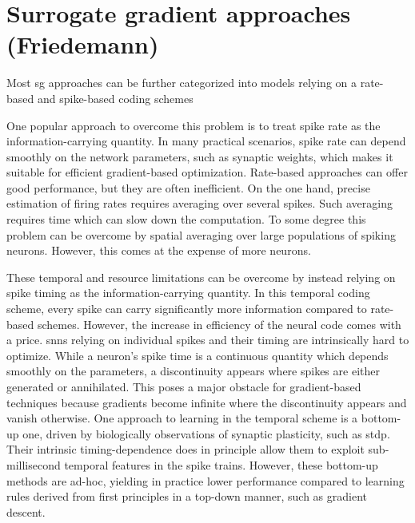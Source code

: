 \documentclass[journal,onecolumn,11pt]{IEEEtran}
\begin{document}
\section{Surrogate gradient approaches (Friedemann)}


Most \gls{sg} approaches can be further categorized into models relying on a rate-based and spike-based coding schemes

One popular approach to overcome this problem is to treat spike rate as the information-carrying quantity.
In many practical scenarios, spike rate can depend smoothly on the network parameters, such as synaptic weights, which makes it suitable for efficient gradient-based optimization.
Rate-based approaches can offer good performance, but they are often inefficient. On the one hand, precise estimation of firing rates requires averaging over several spikes. 
Such averaging requires time which can slow down the computation. To some degree this problem can be overcome by spatial averaging over large populations of spiking neurons. However, this comes at the expense of more neurons. 

These temporal and resource limitations can be overcome by instead relying on spike timing as the information-carrying quantity.
In this temporal coding scheme, every spike can carry significantly more information compared to rate-based schemes.
However, the increase in efficiency of the neural code comes with a price. \glspl{snn} relying on individual spikes and their timing are intrinsically hard to optimize.
While a neuron's spike time is a continuous quantity which depends smoothly on the parameters, a discontinuity appears where spikes are either generated or annihilated. This poses a major obstacle for gradient-based techniques because gradients become infinite where the discontinuity appears and vanish otherwise.
One approach to learning in the temporal scheme is a bottom-up one, driven by biologically observations of synaptic plasticity, such as \gls{stdp}.
Their intrinsic timing-dependence does in principle allow them to exploit sub-millisecond temporal features in the spike trains. 
However, these bottom-up methods are ad-hoc, yielding in practice lower performance compared to learning rules derived from first principles in a top-down manner, such as gradient descent.
\end{document}
